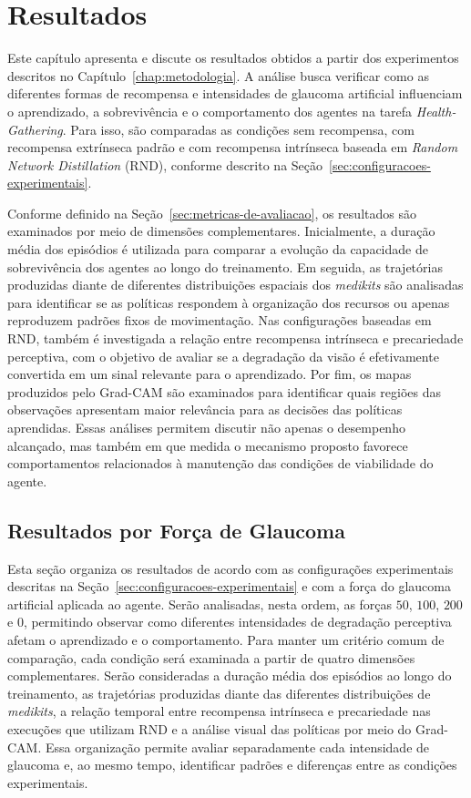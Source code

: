 \chapter{Resultados}
\label{chap:resultados}

Este capítulo apresenta e discute os resultados obtidos a partir dos experimentos descritos no Capítulo~\ref{chap:metodologia}. A análise busca verificar como as diferentes formas de recompensa e intensidades de glaucoma artificial influenciam o aprendizado, a sobrevivência e o comportamento dos agentes na tarefa \textit{Health-Gathering}. Para isso, são comparadas as condições sem recompensa, com recompensa extrínseca padrão e com recompensa intrínseca baseada em \textit{Random Network Distillation} (RND), conforme descrito na Seção~\ref{sec:configuracoes-experimentais}.

Conforme definido na Seção~\ref{sec:metricas-de-avaliacao}, os resultados são examinados por meio de dimensões complementares. Inicialmente, a duração média dos episódios é utilizada para comparar a evolução da capacidade de sobrevivência dos agentes ao longo do treinamento. Em seguida, as trajetórias produzidas diante de diferentes distribuições espaciais dos \textit{medikits} são analisadas para identificar se as políticas respondem à organização dos recursos ou apenas reproduzem padrões fixos de movimentação. Nas configurações baseadas em RND, também é investigada a relação entre recompensa intrínseca e precariedade perceptiva, com o objetivo de avaliar se a degradação da visão é efetivamente convertida em um sinal relevante para o aprendizado. Por fim, os mapas produzidos pelo Grad-CAM são examinados para identificar quais regiões das observações apresentam maior relevância para as decisões das políticas aprendidas. Essas análises permitem discutir não apenas o desempenho alcançado, mas também em que medida o mecanismo proposto favorece comportamentos relacionados à manutenção das condições de viabilidade do agente.

\section{Resultados por Força de Glaucoma}

Esta seção organiza os resultados de acordo com as configurações experimentais descritas na Seção~\ref{sec:configuracoes-experimentais} e com a força do glaucoma artificial aplicada ao agente. Serão analisadas, nesta ordem, as forças $50$, $100$, $200$ e $0$, permitindo observar como diferentes intensidades de degradação perceptiva afetam o aprendizado e o comportamento. Para manter um critério comum de comparação, cada condição será examinada a partir de quatro dimensões complementares. Serão consideradas a duração média dos episódios ao longo do treinamento, as trajetórias produzidas diante das diferentes distribuições de \textit{medikits}, a relação temporal entre recompensa intrínseca e precariedade nas execuções que utilizam RND e a análise visual das políticas por meio do Grad-CAM. Essa organização permite avaliar separadamente cada intensidade de glaucoma e, ao mesmo tempo, identificar padrões e diferenças entre as condições experimentais.

